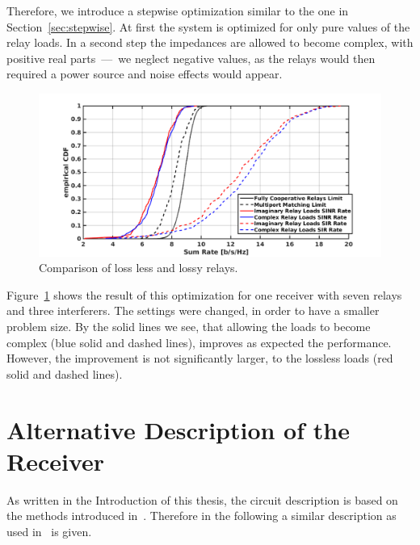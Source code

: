 Therefore, we introduce a stepwise optimization similar to the one in Section~\ref{sec:stepwise}.
At first the system is optimized for only pure values of the relay loads.
In a second step the impedances are allowed to become complex, with positive real parts~---~we neglect negative values, as the relays would then required a power source and noise effects would appear.
\begin{figure}[h]
\centering
  \includegraphics[width=\linewidth]{images/Imagvscomp_2.png}
\caption{Comparison of loss less and lossy relays.}
\label{fig:lossyrel_2}
\end{figure}

Figure~\ref{fig:lossyrel_2} shows the result of this optimization for one receiver with seven relays and three interferers.
The settings were changed, in order to have a smaller problem size.
By the solid lines we see, that allowing the loads to become complex (blue solid and dashed lines), improves as expected the performance.
However, the improvement is not significantly larger, to the lossless loads (red solid and dashed lines).

\chapter{Alternative Description of the Receiver}
\label{sec:nossek}

As written in the Introduction of this thesis, the circuit description is based on the methods introduced in~\cite{Nossek}.
Therefore in the following a similar description as used in~\cite{Nossek} is given. 

